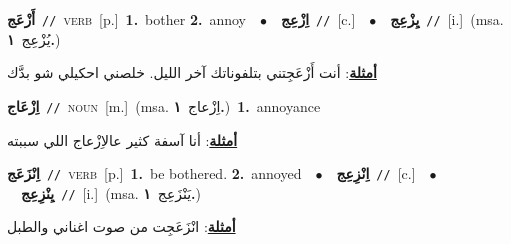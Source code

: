 \documentclass[10pt,a4paper,twoside]{article} %
\begin{document}
\begin{multicols}{2}
{\setlength\topsep{0pt}\textbf{\foreignlanguage{arabic}{أَزْعَج}}\ {\color{gray}\texttt{//}\color{black}}\ \textsc{verb}\ [p.]\ \textbf{1.}~bother  \textbf{2.}~annoy\ \ $\bullet$\ \ \setlength\topsep{0pt}\textbf{\foreignlanguage{arabic}{اِزْعِج}}\ {\color{gray}\texttt{//}\color{black}}\ [c.]\ \ $\bullet$\ \ \setlength\topsep{0pt}\textbf{\foreignlanguage{arabic}{يِزْعِج}}\ {\color{gray}\texttt{//}\color{black}}\ [i.]\ \color{gray}(msa. \foreignlanguage{arabic}{يُزْعِج}~\foreignlanguage{arabic}{\textbf{١.}})\color{black}\  \begin{flushright}\color{gray}\foreignlanguage{arabic}{\textbf{\underline{\foreignlanguage{arabic}{أمثلة}}}: أنت أَزْعَجِتني بتلفوناتك آخر الليل. خلصني احكيلي شو بدَّك}\end{flushright}\color{black}} \vspace{2mm}

{\setlength\topsep{0pt}\textbf{\foreignlanguage{arabic}{اِزْعَاج}}\ {\color{gray}\texttt{//}\color{black}}\ \textsc{noun}\ [m.]\ \color{gray}(msa. \foreignlanguage{arabic}{اِزْعاج}~\foreignlanguage{arabic}{\textbf{١.}})\color{black}\ \textbf{1.}~annoyance\  \begin{flushright}\color{gray}\foreignlanguage{arabic}{\textbf{\underline{\foreignlanguage{arabic}{أمثلة}}}: أنا آسفة كثير عالاِزْعاج اللي سببته}\end{flushright}\color{black}} \vspace{2mm}

{\setlength\topsep{0pt}\textbf{\foreignlanguage{arabic}{اِنْزَعَج}}\ {\color{gray}\texttt{//}\color{black}}\ \textsc{verb}\ [p.]\ \textbf{1.}~be bothered.  \textbf{2.}~annoyed\ \ $\bullet$\ \ \setlength\topsep{0pt}\textbf{\foreignlanguage{arabic}{اِنْزِعِج}}\ {\color{gray}\texttt{//}\color{black}}\ [c.]\ \ $\bullet$\ \ \setlength\topsep{0pt}\textbf{\foreignlanguage{arabic}{يِنْزِعِج}}\ {\color{gray}\texttt{//}\color{black}}\ [i.]\ \color{gray}(msa. \foreignlanguage{arabic}{يَنْزَعِج}~\foreignlanguage{arabic}{\textbf{١.}})\color{black}\  \begin{flushright}\color{gray}\foreignlanguage{arabic}{\textbf{\underline{\foreignlanguage{arabic}{أمثلة}}}: انْزَعَجِت من صوت اغناني والطبل}\end{flushright}\color{black}} \vspace{2mm}


\end{multicols}
\end{document}
